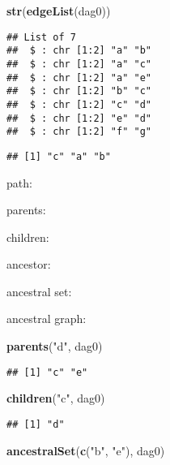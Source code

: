 \documentclass[]{article}
\newenvironment{Shaded}{\begin{snugshade}}{\end{snugshade}}
\newcommand{\KeywordTok}[1]{\textcolor[rgb]{0.13,0.29,0.53}{\textbf{#1}}}
\newcommand{\StringTok}[1]{\textcolor[rgb]{0.31,0.60,0.02}{#1}}
\newcommand{\OperatorTok}[1]{\textcolor[rgb]{0.81,0.36,0.00}{\textbf{#1}}}
\newcommand{\NormalTok}[1]{#1}
\begin{document}
\begin{Shaded}
\begin{Highlighting}[]
\KeywordTok{str}\NormalTok{(}\KeywordTok{edgeList}\NormalTok{(dag0))}
\end{Highlighting}
\end{Shaded}

\begin{verbatim}
## List of 7
##  $ : chr [1:2] "a" "b"
##  $ : chr [1:2] "a" "c"
##  $ : chr [1:2] "a" "e"
##  $ : chr [1:2] "b" "c"
##  $ : chr [1:2] "c" "d"
##  $ : chr [1:2] "e" "d"
##  $ : chr [1:2] "f" "g"
\end{verbatim}

\begin{Shaded}
\end{Shaded}

\begin{verbatim}
## [1] "c" "a" "b"
\end{verbatim}

path:

parents:

children:

ancestor:

ancestral set:

ancestral graph:

\begin{Shaded}
\begin{Highlighting}[]
\KeywordTok{parents}\NormalTok{(}\StringTok{"d"}\NormalTok{, dag0)}
\end{Highlighting}
\end{Shaded}

\begin{verbatim}
## [1] "c" "e"
\end{verbatim}

\begin{Shaded}
\begin{Highlighting}[]
\KeywordTok{children}\NormalTok{(}\StringTok{"c"}\NormalTok{, dag0)}
\end{Highlighting}
\end{Shaded}

\begin{verbatim}
## [1] "d"
\end{verbatim}

\begin{Shaded}
\begin{Highlighting}[]
\KeywordTok{ancestralSet}\NormalTok{(}\KeywordTok{c}\NormalTok{(}\StringTok{"b"}\NormalTok{, }\StringTok{"e"}\NormalTok{), dag0)}
\end{Highlighting}
\end{Shaded}
\end{document}
